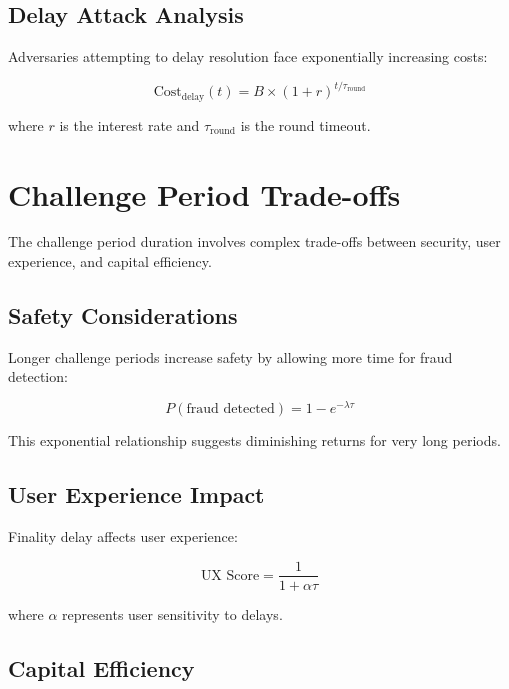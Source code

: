 \documentclass[11pt,a4paper]{article}
\theoremstyle{definition}
\begin{document}
\subsection{Delay Attack Analysis}

Adversaries attempting to delay resolution face exponentially increasing costs:

\begin{equation}
\text{Cost}_{\text{delay}}(t) = B \times (1 + r)^{t/\tau_{\text{round}}}
\end{equation}

where $r$ is the interest rate and $\tau_{\text{round}}$ is the round timeout.

\section{Challenge Period Trade-offs}

The challenge period duration involves complex trade-offs between security, user experience, and capital efficiency.

\subsection{Safety Considerations}

Longer challenge periods increase safety by allowing more time for fraud detection:

\begin{equation}
P(\text{fraud detected}) = 1 - e^{-\lambda \tau}
\end{equation}

This exponential relationship suggests diminishing returns for very long periods.

\subsection{User Experience Impact}

Finality delay affects user experience:

\begin{equation}
\text{UX Score} = \frac{1}{1 + \alpha \tau}
\end{equation}

where $\alpha$ represents user sensitivity to delays.

\subsection{Capital Efficiency}
\end{document}
